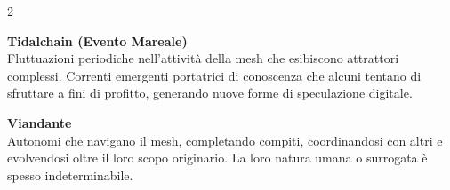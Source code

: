 {\begin{multicols}{2}
\medskip

\noindent\textbf{Tidalchain (Evento Mareale)}\\
Fluttuazioni periodiche nell'attività della mesh che esibiscono attrattori complessi. Correnti emergenti portatrici di conoscenza che alcuni tentano di sfruttare a fini di profitto, generando nuove forme di speculazione digitale.

\medskip

\noindent\textbf{Viandante}\\
Autonomi che navigano il mesh, completando compiti, coordinandosi con altri e evolvendosi oltre il loro scopo originario. La loro natura umana o surrogata è spesso indeterminabile.

\end{multicols}
}
